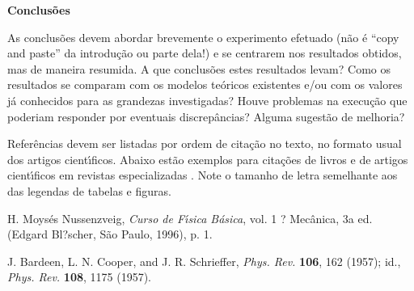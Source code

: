\documentclass[twocolumn]{article}
\newcommand{\2}{\hspace{5mm}}
\newcommand{\5}{\vspace{5mm}}
\newcommand{\7}{\vspace{7mm}}
\begin{document}
\7

{\bf Conclus\~oes}

\5

\2 As conclus\~oes devem abordar brevemente o experimento efetuado (n\~ao 
\'e ``copy and paste'' da introdu\c{c}\~ao ou parte dela!) e se centrarem 
nos resultados obtidos, mas de maneira resumida. A que conclus\~oes estes 
resultados levam? Como os resultados se comparam com os modelos te\'oricos 
existentes e/ou com os valores j\'a conhecidos para as grandezas 
investigadas? Houve problemas na execu\c{c}\~ao que poderiam responder por 
eventuais discrep\^ancias? Alguma sugest\~ao de melhoria?

\7

\2 Refer\^encias devem ser listadas por ordem de cita\c{c}\~ao no texto, 
no formato usual dos artigos cient\'{\i}ficos. Abaixo est\~ao exemplos 
para cita\c{c}\~oes de livros \cite{moyses} e de artigos cient\'{\i}ficos 
em revistas especializadas \cite{BCS}. Note o tamanho de letra semelhante 
aos das legendas de tabelas e figuras.

\7 

\begin{thebibliography}{99}

 H. Moys\'es Nussenzveig, {\it Curso de F\'{\i}sica 
B\'asica}, vol. 1 ? Mec\^anica, 3a ed. (Edgard Bl?scher, S\~ao Paulo, 
1996), p. 1.

 J. Bardeen, L. N. Cooper, and J. R. Schrieffer, {\it Phys. 
Rev.} {\bf 106}, 162 (1957); id., {\it Phys. Rev.} {\bf 108}, 1175 (1957).
 
\end{thebibliography}
\end{document}
